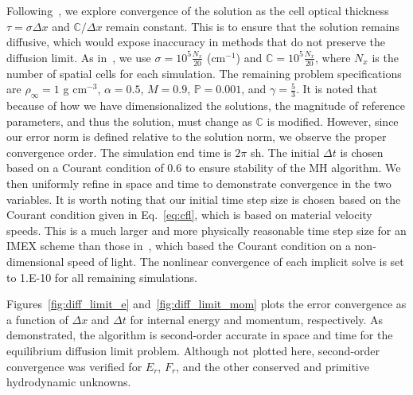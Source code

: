 \documentclass[preprint,12pt]{elsarticle}
\newcommand{\E}{{E_r}}
\newcommand{\F}{{F_r}}
\begin{document}
Following~\cite{mcclarren2}, we explore convergence of the solution as the cell optical thickness $\tau=\sigma \Delta x$ and
$\mathbb{C}/\Delta x$ remain constant.  This is to ensure that the solution remains diffusive, which would expose inaccuracy in methods that
do not preserve the diffusion limit.  As in~\cite{mcclarren2}, we use $\sigma=10^5\frac{N_x}{20}$ (cm$^{-1}$) and $\mathbb{C}=10^5\frac{N_x}{20}$,
where $N_x$ is the number of spatial cells for each simulation.  The remaining problem specifications are $\rho_{\infty}=1$ g cm$^{-3}$,
$\alpha=0.5$, $M=0.9$, $\mathbb{P}=0.001$, 
and $\gamma=\frac{5}{3}$.    It is noted that because of how we have dimensionalized the solutions, the magnitude of reference parameters, and
thus the solution, must change as $\mathbb{C}$ is modified.  However, since our error norm is defined relative to the solution
norm, we observe the proper
convergence order. The simulation end time is $2\pi$ sh. The initial $\Delta t$ is
chosen based on a Courant condition of 0.6 to ensure stability
of the MH algorithm. We
then uniformly refine in space and time to demonstrate convergence in the two variables.  It is worth noting that our initial time step size is chosen based on
the Courant condition given in Eq.~\eqref{eq:cfl}, which is based on material velocity speeds.  This is a much larger and more physically reasonable
time step size for an IMEX scheme than those in~\cite{mcclarren2}, which based the
Courant condition on a non-dimensional speed of light.   The nonlinear
convergence of each implicit solve is set to 1.E-10 for all remaining simulations.

Figures~\ref{fig:diff_limit_e} and~\ref{fig:diff_limit_mom} plots the error convergence as a function of $\Delta x$ and $\Delta t$ for
internal energy and momentum, respectively.  As demonstrated, the algorithm is second-order accurate in space and time for the equilibrium diffusion limit problem.  Although not plotted here,
second-order convergence
was verified for $\E$, $\F$, and the other conserved and primitive hydrodynamic unknowns.
\end{document}
